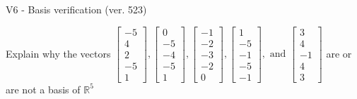 \begin{exercise}
  \begin{exerciseTitle}V6 - Basis verification (ver. 523)\end{exerciseTitle}
  \begin{exerciseStatement}
    Explain why the vectors \(\left[\begin{array}{r}
-5 \\
4 \\
2 \\
-5 \\
1
\end{array}\right] , \left[\begin{array}{r}
0 \\
-5 \\
-4 \\
-5 \\
1
\end{array}\right] , \left[\begin{array}{r}
-1 \\
-2 \\
-3 \\
-2 \\
0
\end{array}\right] , \left[\begin{array}{r}
1 \\
-5 \\
-1 \\
-5 \\
-1
\end{array}\right] , \text{ and } \left[\begin{array}{r}
3 \\
4 \\
-1 \\
4 \\
3
\end{array}\right]\) are or are not a basis of \(\mathbb{R}^5\)	



\end{exerciseStatement}
\end{exercise}
